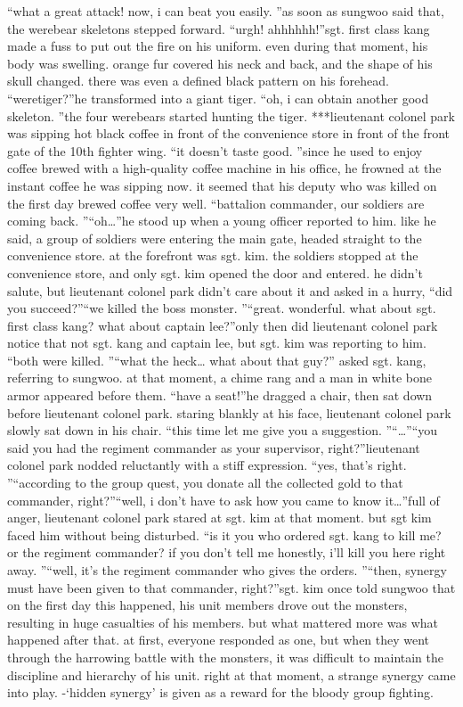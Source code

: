 “what a great attack! now, i can beat you easily.
”as soon as sungwoo said that, the werebear skeletons stepped forward.
“urgh! ahhhhhh!”sgt.
 first class kang made a fuss to put out the fire on his uniform.
 even during that moment, his body was swelling.
 orange fur covered his neck and back, and the shape of his skull changed.
 there was even a defined black pattern on his forehead.
“weretiger?”he transformed into a giant tiger.
“oh, i can obtain another good skeleton.
”the four werebears started hunting the tiger.
***lieutenant colonel park was sipping hot black coffee in front of the convenience store in front of the front gate of the 10th fighter wing.
“it doesn’t taste good.
”since he used to enjoy coffee brewed with a high-quality coffee machine in his office, he frowned at the instant coffee he was sipping now.
 it seemed that his deputy who was killed on the first day brewed coffee very well.
“battalion commander, our soldiers are coming back.
”“oh…”he stood up when a young officer reported to him.
 like he said, a group of soldiers were entering the main gate, headed straight to the convenience store.
at the forefront was sgt.
 kim.
 the soldiers stopped at the convenience store, and only sgt.
 kim opened the door and entered.
he didn’t salute, but lieutenant colonel park didn’t care about it and asked in a hurry, “did you succeed?”“we killed the boss monster.
”“great.
 wonderful.
 what about sgt.
 first class kang? what about captain lee?”only then did lieutenant colonel park notice that not sgt.
 kang and captain lee, but sgt.
 kim was reporting to him.
“both were killed.
”“what the heck… what about that guy?” asked sgt.
 kang, referring to sungwoo.
at that moment, a chime rang and a man in white bone armor appeared before them.
“have a seat!”he dragged a chair, then sat down before lieutenant colonel park.
 staring blankly at his face, lieutenant colonel park slowly sat down in his chair.
“this time let me give you a suggestion.
”“…”“you said you had the regiment commander as your supervisor, right?”lieutenant colonel park nodded reluctantly with a stiff expression.
 “yes, that’s right.
”“according to the group quest, you donate all the collected gold to that commander, right?”“well, i don’t have to ask how you came to know it…”full of anger, lieutenant colonel park stared at sgt.
 kim at that moment.
 but sgt kim faced him without being disturbed.
“is it you who ordered sgt.
 kang to kill me? or the regiment commander? if you don’t tell me honestly, i’ll kill you here right away.
”“well, it’s the regiment commander who gives the orders.
”“then, synergy must have been given to that commander, right?”sgt.
 kim once told sungwoo that on the first day this happened, his unit members drove out the monsters, resulting in huge casualties of his members.
but what mattered more was what happened after that.
at first, everyone responded as one, but when they went through the harrowing battle with the monsters, it was difficult to maintain the discipline and hierarchy of his unit.
right at that moment, a strange synergy came into play.
-‘hidden synergy’ is given as a reward for the bloody group fighting.


